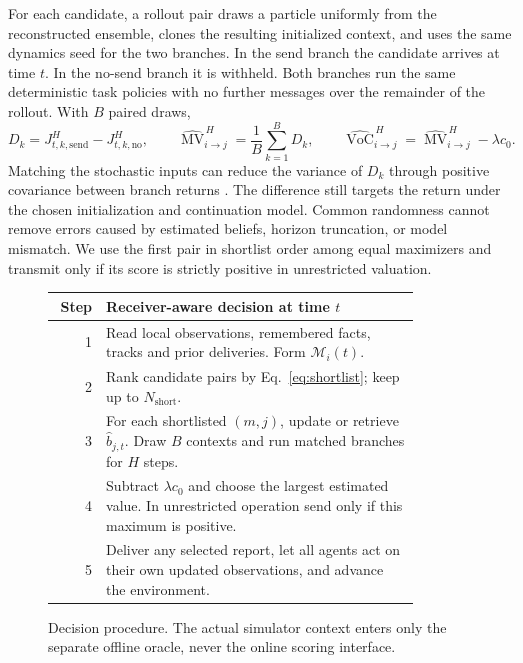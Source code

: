\documentclass{article}
\newcommand{\MV}{\operatorname{MV}}
\newcommand{\VoC}{\operatorname{VoC}}
\begin{document}
For each candidate, a rollout pair draws a particle uniformly from the reconstructed ensemble, clones the resulting initialized context, and uses the same dynamics seed for the two branches. In the send branch the candidate arrives at time $t$. In the no-send branch it is withheld. Both branches run the same deterministic task policies with no further messages over the remainder of the rollout. With $B$ paired draws,
\begin{equation}
 D_k=J_{t,k,\mathrm{send}}^H-J_{t,k,\mathrm{no}}^H,\qquad
 \widehat{\MV}^{\,H}_{i\to j}=\frac{1}{B}\sum_{k=1}^{B}D_k,\qquad
 \widehat{\VoC}^{\,H}_{i\to j}=\widehat{\MV}^{\,H}_{i\to j}-\lambda c_0 .
 \label{eq:estimator}
\end{equation}
Matching the stochastic inputs can reduce the variance of $D_k$ through positive covariance between branch returns \cite{glasserman1992}. The difference still targets the return under the chosen initialization and continuation model. Common randomness cannot remove errors caused by estimated beliefs, horizon truncation, or model mismatch. We use the first pair in shortlist order among equal maximizers and transmit only if its score is strictly positive in unrestricted valuation.

\begin{figure}[t]
\centering
\begin{minipage}{0.95\linewidth}
\small
\begin{tabular}{@{}r p{0.86\linewidth}@{}}
\toprule
Step & Receiver-aware decision at time $t$\\
\midrule
1 & Read local observations, remembered facts, tracks and prior deliveries. Form $\mathcal M_i(t)$.\\
2 & Rank candidate pairs by Eq.~\eqref{eq:shortlist}; keep up to $N_{\mathrm{short}}$.\\
3 & For each shortlisted $(m,j)$, update or retrieve $\widehat b_{j,t}$. Draw $B$ contexts and run matched branches for $H$ steps.\\
4 & Subtract $\lambda c_0$ and choose the largest estimated value. In unrestricted operation send only if this maximum is positive.\\
5 & Deliver any selected report, let all agents act on their own updated observations, and advance the environment.\\
\bottomrule
\end{tabular}
\end{minipage}
\caption{Decision procedure. The actual simulator context enters only the separate offline oracle, never the online scoring interface.}
\label{fig:algorithm}
\end{figure}
\end{document}
